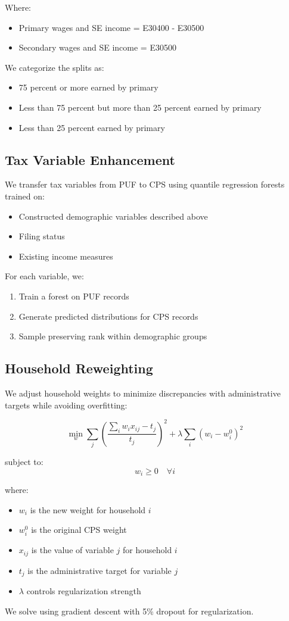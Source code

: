 Where:
\begin{itemize}
    \item Primary wages and SE income = E30400 - E30500
    \item Secondary wages and SE income = E30500
\end{itemize}

We categorize the splits as:
\begin{itemize}
    \item 75 percent or more earned by primary
    \item Less than 75 percent but more than 25 percent earned by primary
    \item Less than 25 percent earned by primary
\end{itemize}

\subsection{Tax Variable Enhancement}

We transfer tax variables from PUF to CPS using quantile regression forests trained on:
\begin{itemize}
    \item Constructed demographic variables described above
    \item Filing status
    \item Existing income measures
\end{itemize}

For each variable, we:
\begin{enumerate}
    \item Train a forest on PUF records
    \item Generate predicted distributions for CPS records
    \item Sample preserving rank within demographic groups
\end{enumerate}

\subsection{Household Reweighting}

We adjust household weights to minimize discrepancies with administrative targets while avoiding overfitting:

\[ \min_w \sum_j \left(\frac{\sum_i w_i x_{ij} - t_j}{t_j}\right)^2 + \lambda \sum_i (w_i - w_i^0)^2 \]

subject to:
\[ w_i \geq 0 \quad \forall i \]

where:
\begin{itemize}
    \item $w_i$ is the new weight for household $i$
    \item $w_i^0$ is the original CPS weight
    \item $x_{ij}$ is the value of variable $j$ for household $i$
    \item $t_j$ is the administrative target for variable $j$
    \item $\lambda$ controls regularization strength
\end{itemize}

We solve using gradient descent with 5\% dropout for regularization.